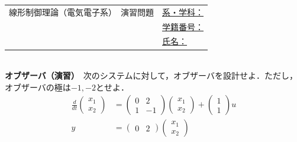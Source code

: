 \documentclass[a4paper,11pt]{jreport}
\begin{document}
\newpage
\begin{tabular}{cl}
\hspace*{2cm}
{\large 線形制御理論（電気電子系）　演習問題}
\hspace{1cm}
&
\underline{系・学科：\hspace{3cm}}
\\[2mm]
&\underline{学籍番号：\hspace{3cm}}
\\[2mm]
&\underline{氏名：\hspace{5cm}}
\end{tabular}
\ \\

\noindent
{\bf オブザーバ（演習）}　次のシステムに対して，オブザーバを設計せよ．ただし，オブザーバの極は$-1,-2$とせよ．
\begin{align*}
	\frac{d}{dt}
	\left (
	\begin{array}{c}
	 x_1 \\ x_2 
	\end{array}
	\right )
	& = 
	\left (
	\begin{array}{cc}
	 0 & 2 \\
	 1 & -1
	\end{array}
	\right )
	\left (
	\begin{array}{c}
	 x_1 \\ x_2 
	\end{array}
	\right )
	+
	\left (
	\begin{array}{c}
	 1 \\ 1 
	\end{array}
	\right )
	u
\\
	y&=
	\left ( \begin{array}{cc}
		0 & 2 
	\end{array} \right )
	\left (	\begin{array}{c}
		x_1 \\ x_2 
	\end{array} \right )
\end{align*}
\end{document}
